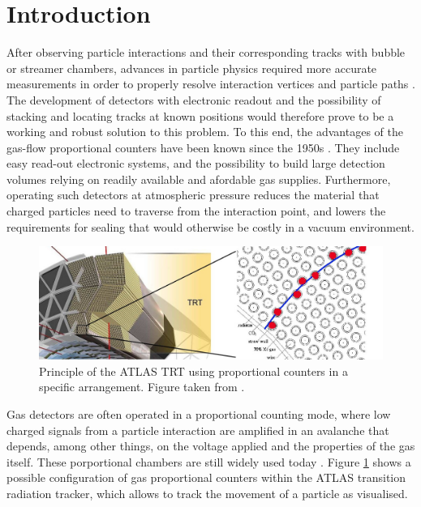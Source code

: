 \section{Introduction}  \label{sec:Introduction}
After observing particle interactions and their corresponding tracks with
bubble or streamer chambers, advances in particle physics required more accurate measurements in order to properly resolve interaction vertices and particle paths \cite{charpak_high-resolution_1984}. The development of detectors with electronic readout and the possibility of stacking and locating tracks at known positions would therefore
prove to be a working and robust solution to this problem. To this end, the advantages of
the gas-flow proportional counters have been known since the 1950s \cite{hendee_gasflow_1956}. They include easy read-out electronic systems, and the possibility to build large detection volumes relying on readily available and afordable gas supplies. Furthermore, operating such detectors at atmospheric pressure reduces the material that charged particles need to traverse from the interaction point, and lowers the requirements for sealing that would otherwise be costly in a vacuum environment.

\begin{figure}[htb!]
  \includegraphics[width=\linewidth]{graphics/ATLAS_TRT_Principle_image}
  \caption{Principle of the ATLAS TRT using proportional counters in a specific
    arrangement. Figure taken from \cite{colliderscope}.}
  \label{fig:colliderscope}
\end{figure}

Gas detectors are often operated in a proportional counting mode, where low charged signals from a particle interaction are amplified in an avalanche that depends, among other things, on the voltage applied and the properties of the gas itself. These porportional chambers are still widely used today \cite{Mindur:2017nqn}. Figure \ref{fig:colliderscope} shows a possible configuration of gas proportional counters within the ATLAS transition radiation tracker, which allows to track the movement of a particle as visualised.

